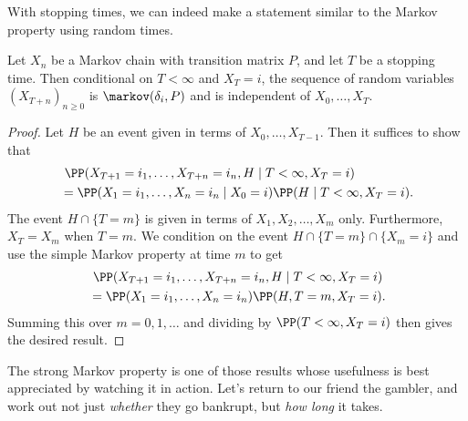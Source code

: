 With stopping times, we can indeed make a statement similar to the Markov property using random times.

\begin{theorem}	
Let $X_n$ be a Markov chain with transition matrix $P$, and let $T$ be a stopping time. Then conditional on $T < \infty$ and $X_T = i$, the sequence of random variables $(X_{T + n})_{n \geq 0}$ is $\markov(\delta_i, P)$ and is independent of $X_0, \dots, X_T$.
\end{theorem}
\begin{proof}
Let $H$ be an event given in terms of $X_0, \dots, X_{T - 1}$. Then it suffices to show that
\begin{align*}
	&\ \PP(X_{T + 1} = i_1, \dots, X_{T + n} = i_n, H \mid T < \infty, X_T = i)  \\
	&= \PP(X_1 = i_1, \dots, X_n = i_n \mid X_0 = i) \PP(H \mid T < \infty, X_T = i).
\end{align*}
The event $H \cap \{T = m\}$ is given in terms of $X_1, X_2, \dots, X_m$ only. Furthermore, $X_T = X_m$ when $T = m$. We condition on the event $H \cap \{T = m\} \cap \{X_m = i\}$ and use the simple Markov property at time $m$ to get
\begin{align*}
&\ \PP(X_{T + 1} = i_1, \dots, X_{T + n} = i_n, H \mid T < \infty, X_T = i) \\
&= \PP(X_1 = i_1, \dots, X_n = i_n) \PP(H, T = m, X_T = i).
\end{align*}
Summing this over $m = 0, 1, \dots$ and dividing by $\PP(T < \infty, X_T = i)$ then gives the desired result.
\end{proof}

The strong Markov property is one of those results whose usefulness is best appreciated by watching it in action. Let's return to our friend the gambler, and work out not just \emph{whether} they go bankrupt, but \emph{how long} it takes.

